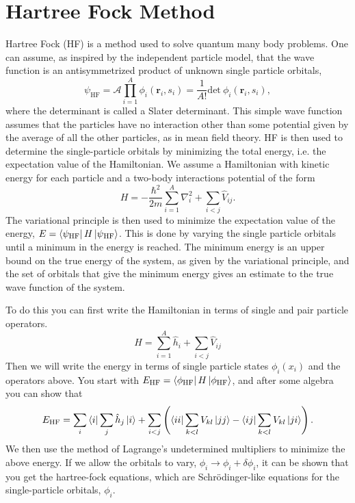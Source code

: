 \section{Hartree Fock Method}
Hartree Fock (HF) is a method used to solve quantum many body problems. One can assume, as inspired by the independent particle model, that the wave function is an antisymmetrized product of unknown single particle orbitals,
\begin{equation}
   \psi_{\mathrm{HF}} = \mathcal{A} \prod\limits_{i=1}^A \phi_i(\mathbf{r}_i,s_i) = \frac{1}{A!} \mathrm{det}~\phi_i(\mathbf{r}_i,s_i),
\end{equation}
where the determinant is called a Slater determinant. This simple wave function assumes that the particles have no interaction other than some potential given by the average of all the other particles, as in mean field theory. HF is then used to determine the single-particle orbitals by minimizing the total energy, i.e. the expectation value of the Hamiltonian. We assume a Hamiltonian with kinetic energy for each particle and a two-body interactions potential of the form
\begin{equation}
   H=-\frac{\hbar^2}{2m}\sum\limits_{i=1}^A \nabla_i^2 + \sum\limits_{i<j} \hat{V}_{ij}.
\end{equation}
The variational principle is then used to minimize the expectation value of the energy, $E = \left< \psi_{\mathrm{HF}} \right| H \left| \psi{_\mathrm{HF}} \right>$. This is done by varying the single particle orbitals until a minimum in the energy is reached. The minimum energy is an upper bound on the true energy of the system, as given by the variational principle, and the set of orbitals that give the minimum energy gives an estimate to the true wave function of the system.

To do this you can first write the Hamiltonian in terms of single and pair particle operators.
\begin{equation}
   H = \sum\limits_{i=1}^A \hat{h}_i + \sum\limits_{i<j} \hat{V}_{ij}
\end{equation}
Then we will write the energy in terms of single particle states $\phi_i(x_i)$ and the operators above. You start with $E_\mathrm{HF}=\left< \phi_\mathrm{HF} \right|H\left| \phi_\mathrm{HF} \right>$, and after some algebra you can show that
\begin{equation}
   E_\mathrm{HF} = \sum\limits_{i} \left< i \right|\sum\limits_j\hat{h}_j\left| i \right> + \sum\limits_{i<j} \left(\left< ii \right|\sum\limits_{k<l}V_{kl}\left| jj \right>-\left< ij \right|\sum\limits_{k<l}V_{kl}\left| ji \right>\right).
\end{equation}
We then use the method of Lagrange's undetermined multipliers to minimize the above energy. If we allow the orbitals to vary, $\phi_i \rightarrow \phi_i + \delta\phi_i$, it can be shown that you get the hartree-fock equations, which are Schr\"odinger-like equations for the single-particle orbitals, $\phi_i$. 
